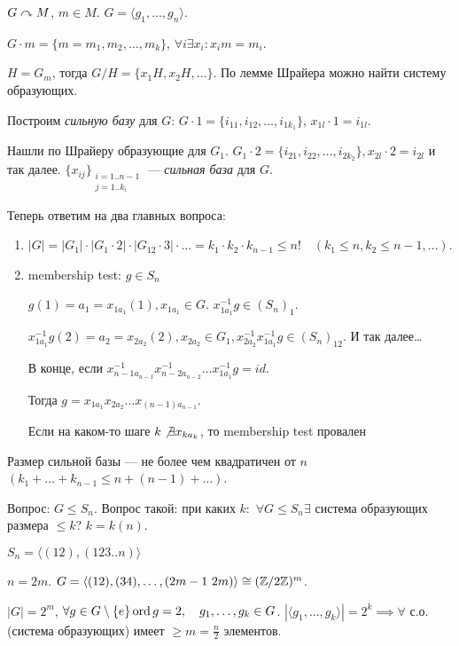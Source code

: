 \begin{exerc}
    $G \curvearrowright M$,  $m \in M$.  $G = \langle g_1, \ldots, g_n\rangle$.

    $G \cdot m = \{ m=m_1,  m_2, \ldots, m_k\}$, $\forall i \exists x_i\!: x_im = m_i$.

     $H = G_m$, тогда  $G / H = \{x_1H, x_2H, \ldots\}$. По лемме Шрайера можно найти систему образующих.

     Построим \textit{сильную базу} для $G$:  $G \cdot 1 = \{i_{11}, i_{12}, \ldots, i_{1k_1}\}$, $x_{1l} \cdot 1 = i_{1l}$.

     Нашли по Шрайеру образующие для  $G_1$. $G_1 \cdot 2 = \{ i_{21}, i_{22}, \ldots, i_{2k_2}\}, x_{2l} \cdot 2 = i_{2l}$ и так далее. $\{x_{ij}\}_{\substack{i=1..n-1\\j=1..k_i}}$ --- \textit{сильная база} для  $G$.

     Теперь ответим на два главных вопроса:
     \begin{enumerate}
         \item $|G| = |G_1| \cdot |G_1 \cdot 2| \cdot |G_{12} \cdot 3| \cdot \ldots = k_1 \cdot k_2 \cdot k_{n-1} \le n! \quad (k_1 \le n, k_2 \le n-1, \ldots)$.

         \item membership test: $g \in S_n$

        $g(1) = a_1 = x_{1a_1}(1), x_{1a_1} \in G$. $x_{1a_1}^{-1} g \in (S_n)_1$.

        $x_{1a_1}^{-1}g(2) = a_2 = x_{2a_2}(2), x_{2a_2} \in G_1, x_{2a_2}^{-1}x_{1a_1}^{-1}g \in (S_n)_{12}$. И так далее\dots

             В конце, если $x_{n-1 a_{n-1}}^{-1} x_{n-2 a_{n-2}}^{-1} \ldots x_{1 a_1}^{-1} g= id$.

             Тогда $g = x_{1 a_1}x_{2 a_2}...x_{(n-1) a_{n-1}}$.

             Если на каком-то шаге $k \not\exists x_{ka_k}$, то membership test провален
     \end{enumerate}
\end{exerc}

\begin{remark}
	Размер сильной базы --- не более чем квадратичен от $n$ $(k_1 + \ldots + k_{n-1} \le n + (n-1) + \ldots)$.
\end{remark}

Вопрос: $G \le S_n$. Вопрос такой: при каких $k\!:$ $\forall G \le S_n \exists$ система образующих размера $\le k$? $k = k(n)$.
\begin{exerc}
    $S_n = \langle (12), (123..n) \rangle$
\end{exerc}
\begin{example}
	$n = 2m$.  $G = \langle (12), (34), \ldots, (2m-1\ 2m)\rangle \cong (\Z / 2 \Z)^m$.

	$|G| = 2^m$,  $\forall g \in G\setminus\{e\} \operatorname{ord} g = 2, \quad g_1, \ldots, g_k \in G$. $|\langle g_1, \ldots, g_k \rangle| = 2^k \implies \forall$ с.о. (система образующих) имеет $\ge m = \frac{n}{2}$ элементов.
\end{example}

